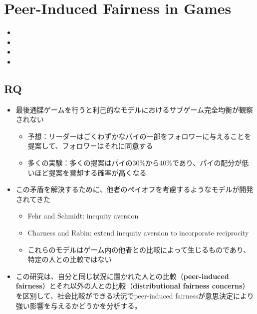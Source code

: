 \documentclass[../root]{subfiles}
\begin{document}
    \chapter{ Peer-Induced Fairness in Games }

    \begin{shortsummary}
        \begin{itemize}
            \item {} 
            \item {}
            \item {}
            \item {}
        \end{itemize}
    \end{shortsummary}

    \hypertarget{rq}{%
    \section{RQ}\label{rq}}

    \begin{itemize}
    
    \item
      最後通牒ゲームを行うと利己的なモデルにおけるサブゲーム完全均衡が観察されない

      \begin{itemize}
      
      \item
        予想：リーダーはごくわずかなパイの一部をフォロワーに与えることを提案して、フォロワーはそれに同意する
      \item
        多くの実験：多くの提案はパイの30\%から40\%であり、パイの配分が低いほど提案を棄却する確率が高くなる
      \end{itemize}
    \item
      この矛盾を解決するために、他者のペイオフを考慮するようなモデルが開発されてきた

      \begin{itemize}
      
      \item
        Fehr and Schmidt: inequity aversion
      \item
        Charness and Rabin: extend inequity aversion to incorporate reciprocity
      \item
        これらのモデルはゲーム内の他者との比較によって生じるものであり、特定の人との比較ではない
      \end{itemize}
    \item
      この研究は、自分と同じ状況に置かれた人との比較（\textbf{peer-induced fairness}）とそれ以外の人との比較（\textbf{distributional fairness concerns}）を区別して、社会比較ができる状況でpeer-induced fairnessが意思決定により強い影響を与えるかどうかを分析する。
    \end{itemize}
\end{document}
